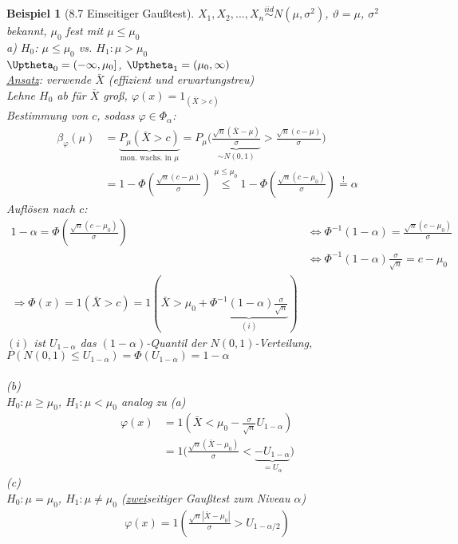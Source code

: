 \documentclass[a4paper,openany]{book}
\theoremstyle{mytheoremstyle}
\newtheorem*{bei}{Beispiel}
\theoremstyle{mytheoremstyle2}
\begin{document}
\begin{bei}[8.7 Einseitiger Gaußtest]
  $X_1,X_2,...,X_n \overset{iid}\sim N(\mu ,\sigma ^2)$, $\vartheta =\mu $, $\sigma ^2$ bekannt, $\mu _0$ fest mit $\mu \leq \mu _0$ \\
  a) $H_0$: $\mu \leq \mu _0$ vs. $H_1:\mu >\mu _0$    \\
  $\Uptheta_0=(-\infty ,\mu _0]$, $\Uptheta_1=(\mu _0,\infty )$\\
  \underline{Ansatz}: verwende $\bar{X}$ (effizient und erwartungstreu)  \\
  Lehne $H_0$ ab für $\bar{X}$ groß, $\varphi (x)=1_{(\bar{X}>c)}$ \\
  Bestimmung von $c$, sodass $\varphi \in \Phi _{\alpha }$: 
  \begin{align*}
    \beta _{\varphi }(\mu )
    &=\underbrace{P _{\mu }(\bar{X}>c)}_{\text{mon. wachs. in $\mu $}}=P _{\mu }\bigg(
    \underbrace{\frac{\sqrt{n}(\bar{X}-\mu )}{\sigma }}_{\sim N(0,1)}>\frac{\sqrt{n}(c-\mu )}{\sigma }\bigg)\\
    &=1-\Phi \left(\frac{\sqrt{n}(c-\mu )}{\sigma }\right)
    \overset{\mu \leq \mu _0}\leq 1-\Phi \left(\frac{\sqrt{n}(c-\mu _0)}{\sigma }\right)\overset{!}=\alpha 
  \end{align*}
  Auflösen nach $c$:
  \begin{align*}
    1-\alpha =\Phi \left(\frac{\sqrt{n}(c-\mu _0)}{\sigma }\right)
    &\Leftrightarrow 
    \Phi ^{-1}(1-\alpha )=\frac{\sqrt{n}(c-\mu _0)}{\sigma }\\
    &\Leftrightarrow \Phi ^{-1}(1-\alpha )\frac{\sigma }{\sqrt{n}}=c-\mu _0 \\
    \Rightarrow \Phi(x)=1(\bar{X}>c)=1(\bar{X}>\mu _0+\underbrace{\Phi ^{-1}(1-\alpha )\frac{\sigma }{\sqrt{n}}}_{(i)})
  \end{align*}
  $(i)$ ist $U _{1-\alpha }$ das $(1-\alpha )$-Quantil der $N(0,1)$-Verteilung, $P(N(0,1)\leq U _{1-\alpha })=\Phi(U _{1-\alpha })=1-\alpha $ \\\\
  (b)\\
  $H_0:\mu \geq \mu _0$, $H_1:\mu < \mu _0$ analog zu (a) 
  \begin{align*}
    \varphi (x)
    &=1\left(\bar{X}<\mu _0-\frac{\sigma }{\sqrt{n}}U _{1-\alpha }\right) \\
    &=1 \bigg(\frac{\sqrt{n}(\bar{X}-\mu _0)}{\sigma }< \underbrace{-U _{1-\alpha }}_{=U _{\alpha }}\bigg)
  \end{align*}
  (c)\\
  $H_0:\mu =\mu _0$, $H_1:\mu  \neq \mu _0$
  (\underline{zwei}seitiger Gaußtest zum Niveau $\alpha $) 
  \begin{align*}
    \varphi (x)=1 \left(\frac{\sqrt{n}|\bar{X}-\mu _0|}{\sigma }>U _{1-\alpha /2}\right)
  \end{align*}
\end{bei}
\end{document}
